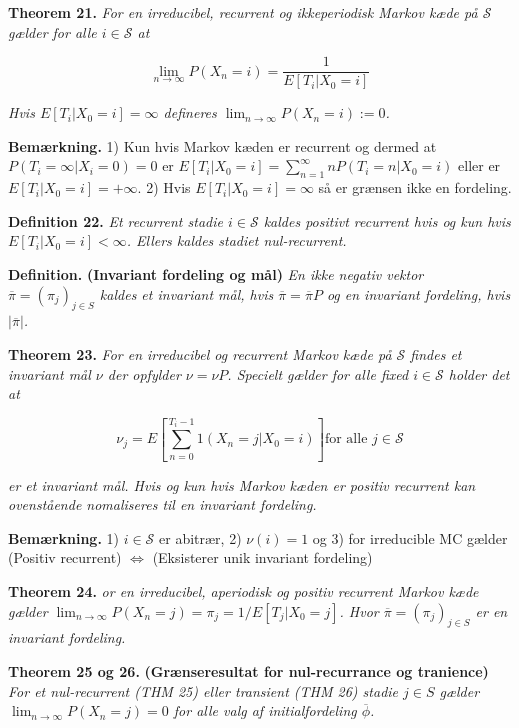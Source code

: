 \documentclass[a4paper,12pt,openany]{book}
\begin{document}
\textbf{Theorem 21.} \emph{For en irreducibel, recurrent og ikkeperiodisk Markov kæde på \(\mathcal{S}\) gælder for alle \(i\in\mathcal{S}\) at}

\[
\lim_{n\to\infty}P(X_n=i)=\frac{1}{E[T_i \vert X_0=i]}
\]

\emph{Hvis \(E[T_i \vert X_0=i]=\infty\) defineres \(\lim_{n\to\infty}P(X_n=i):=0\).}

\textbf{Bemærkning.} 1) Kun hvis Markov kæden er recurrent og dermed at \(P(T_i=\infty \vert X_i=0)=0\) er \(E[T_i \vert X_0=i]=\sum_{n=1}^\infty nP(T_i=n\vert X_0=i)\) eller er \(E[T_i \vert X_0=i]=+\infty\). 2) Hvis \(E[T_i \vert X_0=i]=\infty\) så er grænsen ikke en fordeling.

\textbf{Definition 22.} \emph{Et recurrent stadie \(i\in\mathcal{S}\) kaldes positivt recurrent hvis og kun hvis \(E[T_i \vert X_0=i]<\infty\). Ellers kaldes stadiet nul-recurrent.}

\textbf{Definition.} \textbf{(Invariant fordeling og mål)} \emph{En ikke negativ vektor \(\overline{\pi}=(\pi_j)_{j\in S}\) kaldes et invariant mål, hvis \(\overline{\pi}=\overline{\pi}P\) og en invariant fordeling, hvis \(\vert\overline{\pi}\vert\).}

\textbf{Theorem 23.} \emph{For en irreducibel og recurrent Markov kæde på \(\mathcal{S}\) findes et invariant mål \(\nu\) der opfylder \(\nu =\nu P\). Specielt gælder for alle fixed \(i\in\mathcal{S}\) holder det at}

\[
\nu_j=E\left[\sum_{n=0}^{T_i-1}1(X_n=j \vert X_0=i)\right] \text{for alle } j\in\mathcal{S}
\]

\emph{er et invariant mål. Hvis og kun hvis Markov kæden er positiv recurrent kan ovenstående nomaliseres til en invariant fordeling.}

\textbf{Bemærkning.} 1) \(i\in\mathcal{S}\) er abitrær, 2) \(\nu(i)=1\) og 3) for irreducible MC gælder (Positiv recurrent) \(\Leftrightarrow\) (Eksisterer unik invariant fordeling)

\textbf{Theorem 24.} \emph{or en irreducibel, aperiodisk og positiv recurrent Markov kæde gælder \(\lim_{n\to\infty}P(X_n=j)=\pi_j=1/E[T_j\vert X_0=j]\). Hvor \(\overline{\pi}=(\pi_j)_{j\in S}\) er en invariant fordeling.}

\textbf{Theorem 25 og 26.} \textbf{(Grænseresultat for nul-recurrance og tranience)} \emph{For et nul-recurrent (THM 25) eller transient (THM 26) stadie \(j\in S\) gælder \(\lim_{n\to\infty}P(X_n=j)=0\) for alle valg af initialfordeling \(\overline{\phi}\).}
\end{document}
